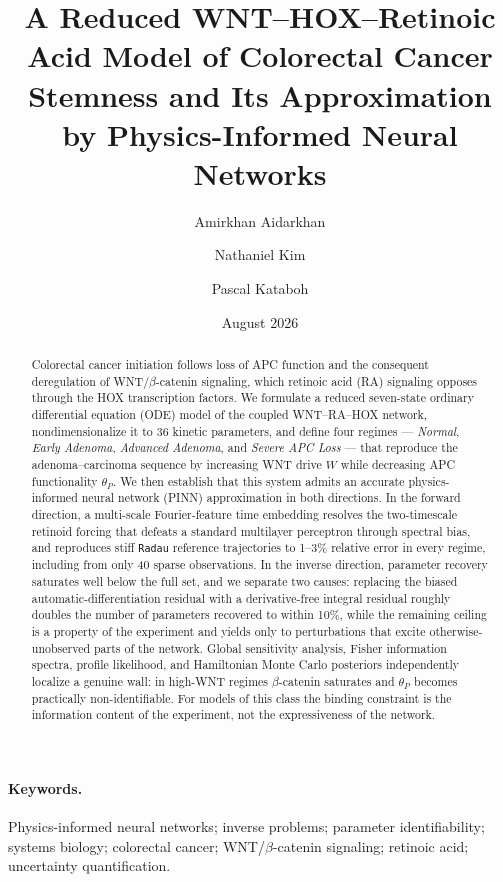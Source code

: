 \documentclass[11pt]{article}
\title{A Reduced WNT--HOX--Retinoic Acid Model of Colorectal Cancer Stemness
and Its Approximation by Physics-Informed Neural Networks}
\author{Amirkhan Aidarkhan \and Nathaniel Kim \and Pascal Kataboh}
\date{August 2026}
\newcommand{\bcat}{$\beta$-\hspace{0pt}catenin}
\newcommand{\thP}{\theta_P}
\begin{document}
\maketitle

\begin{abstract}
Colorectal cancer initiation follows loss of APC function and the consequent
deregulation of WNT/\bcat{} signaling, which retinoic acid (RA) signaling
opposes through the HOX transcription factors. We formulate a reduced
seven-state ordinary differential equation (ODE) model of the coupled
WNT--RA--HOX network, nondimensionalize it to 36 kinetic parameters, and define
four regimes --- \emph{Normal}, \emph{Early Adenoma}, \emph{Advanced Adenoma},
and \emph{Severe APC Loss} --- that reproduce the adenoma--carcinoma sequence by
increasing WNT drive $W$ while decreasing APC functionality $\thP$. We then
establish that this system admits an accurate physics-informed neural network
(PINN) approximation in both directions. In the forward direction, a
multi-scale Fourier-feature time embedding resolves the two-timescale retinoid
forcing that defeats a standard multilayer perceptron through spectral bias, and
reproduces stiff \texttt{Radau} reference trajectories to 1--3\% relative error
in every regime, including from only 40 sparse observations. In the inverse
direction, parameter recovery saturates well below the full set, and we separate
two causes: replacing the biased automatic-differentiation residual with a
derivative-free integral residual roughly doubles the number of parameters
recovered to within 10\%, while the remaining ceiling is a property of the
experiment and yields only to perturbations that excite otherwise-unobserved
parts of the network. Global sensitivity analysis, Fisher information spectra,
profile likelihood, and Hamiltonian Monte Carlo posteriors independently
localize a genuine wall: in high-WNT regimes \bcat{} saturates and $\thP$
becomes practically non-identifiable. For models of this class the binding
constraint is the information content of the experiment, not the expressiveness
of the network.
\end{abstract}

\paragraph{Keywords.} Physics-informed neural networks; inverse problems;
parameter identifiability; systems biology; colorectal cancer;
WNT/\bcat{} signaling; retinoic acid; uncertainty quantification.
\end{document}
